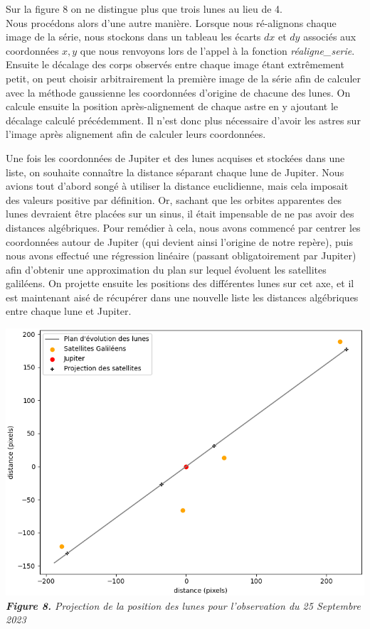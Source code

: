 \documentclass{aa}
\begin{document}
Sur la figure 8 on ne distingue plus que trois lunes au lieu de 4.\\
Nous procédons alors d'une autre manière. Lorsque nous ré-alignons chaque image de la série, nous stockons dans un tableau les écarts $dx$ et $dy$ associés aux coordonnées $x,y$ que nous renvoyons lors de l'appel à la fonction \textit{réaligne\_serie}. Ensuite le décalage des corps observés entre chaque image étant extrêmement petit, on peut choisir arbitrairement la première image de la série afin de calculer avec la méthode gaussienne les coordonnées d'origine de chacune des lunes. On calcule ensuite la position après-alignement de chaque astre en y ajoutant le décalage calculé précédemment. Il n'est donc plus nécessaire d'avoir les astres sur l'image après alignement afin de calculer leurs coordonnées.

Une fois les coordonnées de Jupiter et des lunes acquises et stockées dans une liste, on souhaite connaître la distance séparant chaque lune de Jupiter. Nous avions tout d'abord songé à utiliser la distance euclidienne, mais cela imposait des valeurs positive par définition. Or, sachant que les orbites apparentes des lunes devraient être placées sur un sinus, il était impensable de ne pas avoir des distances algébriques.
Pour remédier à cela, nous avons commencé par centrer les coordonnées autour de Jupiter (qui devient ainsi l'origine de notre repère), puis nous avons effectué une régression linéaire (passant obligatoirement par Jupiter) afin d'obtenir une approximation du plan sur lequel évoluent les satellites galiléens. On projette ensuite les positions des différentes lunes sur cet axe, et il est maintenant aisé de récupérer dans une nouvelle liste les distances algébriques entre chaque lune et Jupiter.

\begin{center}
\includegraphics[scale = 0.56]{images/projection.PNG}\\
\emph{{\textbf{Figure 8.} Projection de la position des lunes pour l'observation du 25 Septembre 2023}}
\end{center}
\end{document}
